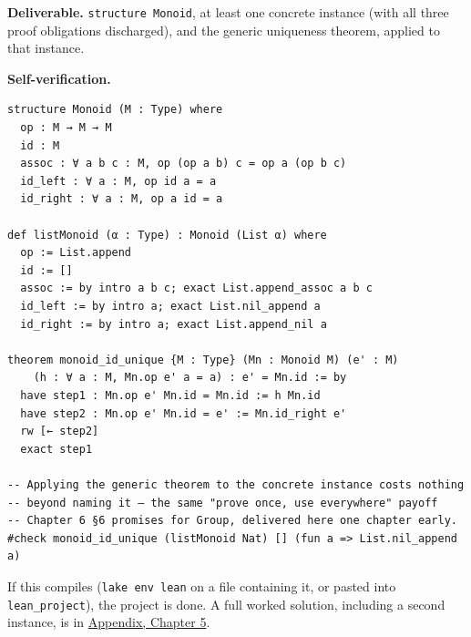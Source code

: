 \begin{pblproject}
\textbf{Deliverable.} \texttt{structure Monoid}, at least one concrete instance (with all three proof obligations discharged), and the generic uniqueness theorem, applied to that instance.

\textbf{Self-verification.}

\begin{lstlisting}
structure Monoid (M : Type) where
  op : M → M → M
  id : M
  assoc : ∀ a b c : M, op (op a b) c = op a (op b c)
  id_left : ∀ a : M, op id a = a
  id_right : ∀ a : M, op a id = a

def listMonoid (α : Type) : Monoid (List α) where
  op := List.append
  id := []
  assoc := by intro a b c; exact List.append_assoc a b c
  id_left := by intro a; exact List.nil_append a
  id_right := by intro a; exact List.append_nil a

theorem monoid_id_unique {M : Type} (Mn : Monoid M) (e' : M)
    (h : ∀ a : M, Mn.op e' a = a) : e' = Mn.id := by
  have step1 : Mn.op e' Mn.id = Mn.id := h Mn.id
  have step2 : Mn.op e' Mn.id = e' := Mn.id_right e'
  rw [← step2]
  exact step1

-- Applying the generic theorem to the concrete instance costs nothing
-- beyond naming it — the same "prove once, use everywhere" payoff
-- Chapter 6 §6 promises for Group, delivered here one chapter early.
#check monoid_id_unique (listMonoid Nat) [] (fun a => List.nil_append a)
\end{lstlisting}

If this compiles (\texttt{lake env lean} on a file containing it, or pasted into \texttt{lean\_\allowbreak{}project}), the project is done. A full worked solution, including a second instance, is in \hyperref[sec:14-appendix-solutions:04-chapter-5:1]{Appendix, Chapter 5}.

\end{pblproject}
